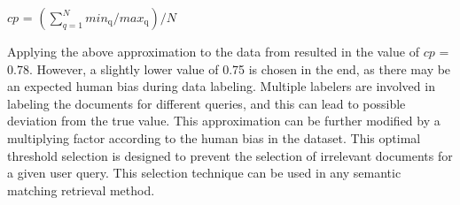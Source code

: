  
  	\centerline{$cp$ = $( \sum\limits_{q=1}^N  min_{\mathrm{q}}/ max_{\mathrm{q}}) /N$}
 
Applying the above approximation to the data from  resulted in the value of $cp$ = 0.78. However, a slightly lower value of 0.75 is chosen in the end, as there may be an expected human bias during data labeling. Multiple labelers are involved in labeling the documents for different queries, and this can lead to possible deviation from the true value. This approximation can be further modified by a multiplying factor according to the human bias in the dataset. This optimal threshold selection is designed to prevent the selection of irrelevant documents for a given user query. This selection technique can be used in any semantic matching retrieval method.

 

